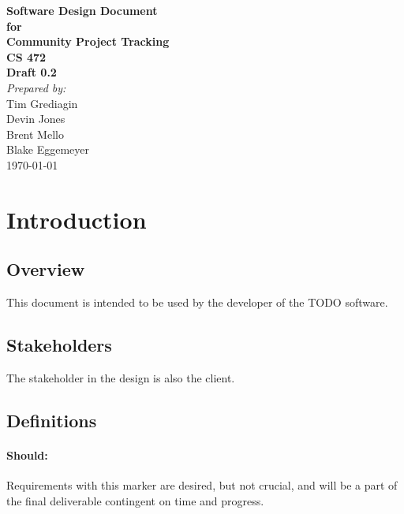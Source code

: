 \documentclass[12pt]{article}
\begin{document}

\begin{titlepage}
\begin{flushright} 
{\LARGE \bfseries Software Design Document}\\[1.2cm]
{\large \bfseries for}\\[1.2cm]
{\huge \bfseries Community Project Tracking}\\[1.2cm]
{\large \bfseries CS 472}\\
\vfill
{\large \bfseries Draft 0.2}\\[2cm]
\textit{Prepared by:} \\
Tim Grediagin\\
Devin Jones\\
Brent Mello\\
Blake Eggemeyer \\ [3cm]
{\large \today}
\\[2cm]
\end{flushright}
\end{titlepage}
\setcounter{tocdepth}{3}
\setcounter{secnumdepth}{5}
\tableofcontents
\newpage

\section{Introduction}


\subsection{Overview}
This document is intended to be used by the developer of the TODO software.

\subsection{Stakeholders}
The stakeholder in the design is also the client.

\subsection{Definitions}
\setcounter{paragraph}{0}
\setcounter{subsubsection}{0}
\paragraph{Should:} Requirements with this marker are desired, but not crucial, and will be a part of the final deliverable contingent on time and progress.
\end{document}

